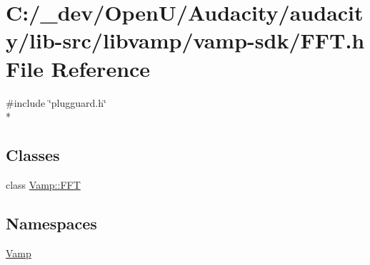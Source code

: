 \hypertarget{lib-src_2libvamp_2vamp-sdk_2fft_8h}{}\section{C\+:/\+\_\+dev/\+Open\+U/\+Audacity/audacity/lib-\/src/libvamp/vamp-\/sdk/\+F\+FT.h File Reference}
\label{lib-src_2libvamp_2vamp-sdk_2fft_8h}
{\ttfamily \#include \char`\"{}plugguard.\+h\char`\"{}}\\*
\subsection*{Classes}
\begin{DoxyCompactItemize}
\item 
class \hyperlink{class_vamp_1_1_f_f_t}{Vamp\+::\+F\+FT}
\end{DoxyCompactItemize}
\subsection*{Namespaces}
\begin{DoxyCompactItemize}
\item 
 \hyperlink{namespace_vamp}{Vamp}
\end{DoxyCompactItemize}
